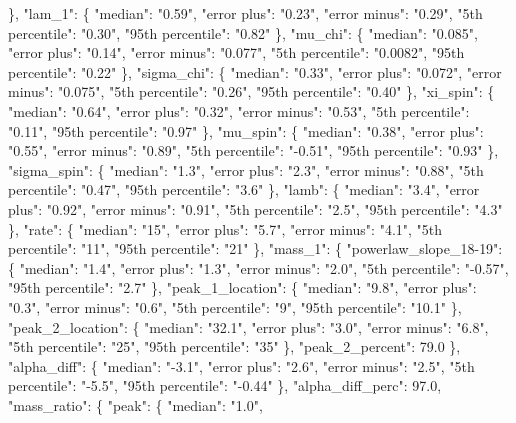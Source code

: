 {{      \}, %
      "lam\_1": \{%
        "median": "0.59", %
        "error plus": "0.23", %
        "error minus": "0.29", %
        "5th percentile": "0.30", %
        "95th percentile": "0.82"%
      \}, %
      "mu\_chi": \{%
        "median": "0.085", %
        "error plus": "0.14", %
        "error minus": "0.077", %
        "5th percentile": "0.0082", %
        "95th percentile": "0.22"%
      \}, %
      "sigma\_chi": \{%
        "median": "0.33", %
        "error plus": "0.072", %
        "error minus": "0.075", %
        "5th percentile": "0.26", %
        "95th percentile": "0.40"%
      \}, %
      "xi\_spin": \{%
        "median": "0.64", %
        "error plus": "0.32", %
        "error minus": "0.53", %
        "5th percentile": "0.11", %
        "95th percentile": "0.97"%
      \}, %
      "mu\_spin": \{%
        "median": "0.38", %
        "error plus": "0.55", %
        "error minus": "0.89", %
        "5th percentile": "{-}0.51", %
        "95th percentile": "0.93"%
      \}, %
      "sigma\_spin": \{%
        "median": "1.3", %
        "error plus": "2.3", %
        "error minus": "0.88", %
        "5th percentile": "0.47", %
        "95th percentile": "3.6"%
      \}, %
      "lamb": \{%
        "median": "3.4", %
        "error plus": "0.92", %
        "error minus": "0.91", %
        "5th percentile": "2.5", %
        "95th percentile": "4.3"%
      \}, %
      "rate": \{%
        "median": "15", %
        "error plus": "5.7", %
        "error minus": "4.1", %
        "5th percentile": "11", %
        "95th percentile": "21"%
      \}, %
      "mass\_1": \{%
        "powerlaw\_slope\_18{-}19": \{%
          "median": "1.4", %
          "error plus": "1.3", %
          "error minus": "2.0", %
          "5th percentile": "{-}0.57", %
          "95th percentile": "2.7"%
        \}, %
        "peak\_1\_location": \{%
          "median": "9.8", %
          "error plus": "0.3", %
          "error minus": "0.6", %
          "5th percentile": "9", %
          "95th percentile": "10.1"%
        \}, %
        "peak\_2\_location": \{%
          "median": "32.1", %
          "error plus": "3.0", %
          "error minus": "6.8", %
          "5th percentile": "25", %
          "95th percentile": "35"%
        \}, %
        "peak\_2\_percent": 79.0%
      \}, %
      "alpha\_diff": \{%
        "median": "{-}3.1", %
        "error plus": "2.6", %
        "error minus": "2.5", %
        "5th percentile": "{-}5.5", %
        "95th percentile": "{-}0.44"%
      \}, %
      "alpha\_diff\_perc": 97.0, %
      "mass\_ratio": \{%
        "peak": \{%
          "median": "1.0", %
}}
